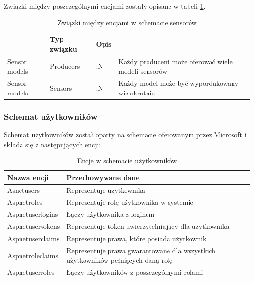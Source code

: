 \documentclass[11pt, a4]{article} %
\begin{document}
Związki między poszczególnymi encjami zostały opisane w tabeli \ref{tab:zwiazki-sensory}.

\begin{table}[!ht]
    \caption{Związki między encjami w schemacie sensorów}
    \label{tab:zwiazki-sensory}
\begin{tabularx}{1\textwidth} { 
        | >{\arraybackslash}X    
        | >{\arraybackslash}X
        | >{\arraybackslash}X     
        | >{\arraybackslash}X | }
        \hline
    \multicolumn{2}{|c|}{Relacja} & Typ związku & Opis \\
    \hline
    Sensor models & Producers & 1:N & 
    Każdy producent może oferować wiele modeli sensorów \\
    \hline
    Sensor models & Sensors & 1:N & 
    Każdy model może być wypordukowany wielokrotnie \\
    \hline
    \end{tabularx}
\end{table}

\subsubsection{Schemat użytkowników}

Schemat użytkowników został oparty na schemacie oferowanym przez Microsoft 
\parencite{vickers:2021an} i składa się z następujących encji:

\begin{table}[!ht]
    \caption{Encje w schemacie użytkowników}
    \label{tab:encje-uzytkownicy}
    \begin{tabularx}{1\textwidth} { 
        | >{\raggedright\arraybackslash}X        
        | >{\raggedleft\arraybackslash}X | }
        \hline
       Nazwa encji & Przechowywane dane \\
       \hline
       Asnetusers & Reprezentuje użytkownika \\
       \hline
       Aspnetroles & Reprezentuje rolę użytkownika w systemie \\
       \hline
       Aspnetuserlogins & Łączy użytkownika z loginem \\
       \hline
       Aspnetusertokens & Reprezentuje token uwierzytelniający dla użytkownika \\
       \hline
       Aspnetuserclaims & Reprezentuje prawa, które posiada użytkownik \\
       \hline
       Aspnetroleclaims & Reprezentuje prawa gwarantowane dla wszystkich użytkowników
       pełniących daną rolę \\
       \hline
       Aspnetuserroles & Łączy użytkowników z poszczególnymi rolami \\
       \hline
    \end{tabularx}
\end{table}
\end{document}
